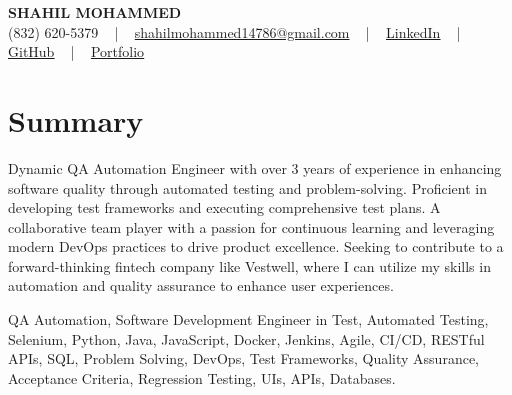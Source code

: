 \documentclass[letterpaper,10pt]{article}
\begin{document}
\begin{center}
    {\fontsize{14pt}{12pt}\selectfont \textbf{\MakeUppercase{Shahil Mohammed}}}\\ \vspace{2pt}
    \fontsize{10pt}{12pt}\selectfont (832) 620-5379 ~ | ~ \href{mailto:shahilmohammed14786@gmail.com}{shahilmohammed14786@gmail.com} ~ | ~  
    \href{https://www.linkedin.com/in/shahil-mohammed-9652931a1/}{\color{blue}\underline{LinkedIn}}  ~ | ~ 
    \href{https://github.com/freakbeast14}{\color{blue}\underline{GitHub}} ~ | ~ 
    \href{https://shahil-mohammed.netlify.app/}{\color{blue}\underline{Portfolio}}
    \vspace{-8pt}
\end{center}

\section{Summary}
\vspace{-2pt}\fontsize{8pt}{9pt}\selectfont
Dynamic QA Automation Engineer with over 3 years of experience in enhancing software quality through automated testing and problem-solving. Proficient in developing test frameworks and executing comprehensive test plans. A collaborative team player with a passion for continuous learning and leveraging modern DevOps practices to drive product excellence. Seeking to contribute to a forward-thinking fintech company like Vestwell, where I can utilize my skills in automation and quality assurance to enhance user experiences.

{\fontsize{1pt}{1pt}\selectfont\color{white}
QA Automation, Software Development Engineer in Test, Automated Testing, Selenium, Python, Java, JavaScript, Docker, Jenkins, Agile, CI/CD, RESTful APIs, SQL, Problem Solving, DevOps, Test Frameworks, Quality Assurance, Acceptance Criteria, Regression Testing, UIs, APIs, Databases.
}
\vspace{-8pt}

\vspace{-2pt}
\end{document}
